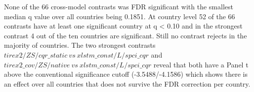 %
None of the 66 cross-model contrasts was FDR significant with the smallest median q value over all countries being 0.1851. At country level 52 of the 66 contrasts have at least one significant country at q < 0.10 and in the strongest contrast 4 out of the ten countries are significant. Still no contrast rejects in the majority of countries.
%
%
The two strongest contrasts $tirex2/ZS/cqr\_static\ vs\ xlstm\_const/L/spci\_cqr$ and $tirex2\_cov/ZS/native\ vs\ xlstm\_const/L/spci\_cqr$ reveal that both have a Panel t above the conventional significance cutoff (-3.5488/-4.1586) which shows there is an effect over all countries that does not survive the FDR correction per country.
